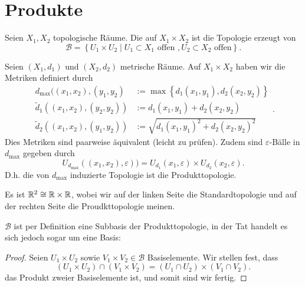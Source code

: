 \section{Produkte}
\begin{definition}[Produkttopologie]\label{def:produkttopologie}
    Seien $X_1,X_2$ topologische Räume. Die  auf $X_1\times X_2$ ist die Topologie erzeugt von
    \[
    \mathcal{B} = \left \{U_1\times U_2 \mid  U_1\subset X_1 \text{ offen }, U_2\subset X_2\text{ offen}\right\} 
    .\] 
\end{definition}
\begin{example}
    Seien $(X_1,d_1)$ und $(X_2,d_2)$ metrische Räume. Auf $X_1\times X_2$ haben wir die Metriken definiert durch
    \[
        \begin{split}
            d_{\max} ((x_1,x_2),(y_1,y_2) &:= \max \left \{d_1(x_1,y_1), d_2(x_2,y_2)\right\}  \\
            \tilde{d}_1((x_1,x_2),(y_2,y_2)) &:= d_1(x_1,y_1) + d_2(x_2,y_2) \\
            \tilde{d}_2((x_1,x_2),(y_1,y_2)) &:= \sqrt{d_1(x_1,y_1)^2 + d_2(x_2,y_2)^2} 
        \end{split}
    .\] 
    Dies Metriken sind paarweise äquivalent (leicht zu prüfen). Zudem sind $ε$-Bälle in  $d_{\max}$ gegeben durch
    \[
        U_{d_{\max}}((x_1,x_2),ε)) = U_{d_1}(x_1,ε) \times U_{d_2}(x_2,ε)
    .\] 
    D.h. die von $d_{\max}$ induzierte Topologie ist die Produkttopologie.
\end{example}
\begin{example}
    Es ist $\mathbb{R}^2 \cong \mathbb{R} \times \mathbb{R}$, wobei wir auf der linken Seite die Standardtopologie und auf der rechten Seite die Proudkttopologie meinen.
\end{example}
\begin{remark}
    $\mathcal{B}$ ist per Definition eine Subbasis der Produkttopologie, in der Tat handelt es sich jedoch sogar um eine Basis:
    \begin{proof}
        Seien $U_1\times U_2$ sowie $V_1\times V_2\in \mathcal{B}$ Basiselemente. Wir stellen fest, dass
        \[
            (U_1\times U_2)\cap (V_1\times V_2) = (U_1\cap U_2) \times (V_1\cap V_2)
        .\] 
        das Produkt zweier Basiselemente ist, und somit sind wir fertig.
    \end{proof}
\end{remark}
